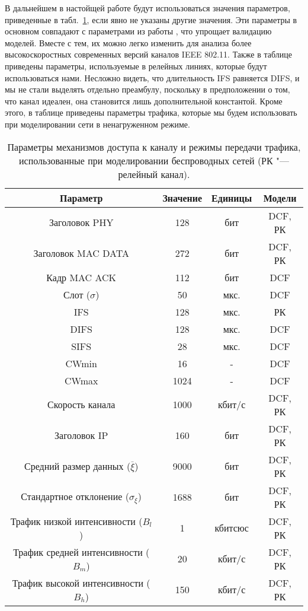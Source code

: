 В дальнейшем в настойщей работе будут использоваться значения параметров, приведенные в табл.~\ref{tab:ch1_channel_parameters}, если явно не указаны другие значения. Эти параметры в основном совпадают с параметрами из работы \cite{Bianchi2000}, что упрощает валидацию моделей. Вместе с тем, их можно легко изменить для анализа более высокоскоростных современных версий каналов IEEE 802.11. Также в таблице приведены параметры, используемые в релейных линиях, которые будут использоваться нами. Несложно видеть, что длительность IFS равняется DIFS, и мы не стали выделять отдельно преамбулу, поскольку в предположении о том, что канал идеален, она становится лишь дополнительной константой. Кроме этого, в таблице приведены параметры трафика, которые мы будем использовать при моделировании сети в ненагруженном режиме.

\begin{table}[h!]\begin{center}
\begin{tabular}{|c|c|c|c|}\hline
Параметр & Значение & Единицы & Модели\\ \hline\hline
Заголовок PHY & 128 & бит & DCF, РК\\ \hline
Заголовок MAC DATA & 272 & бит & DCF, РК \\ \hline
Кадр MAC ACK & 112 & бит & DCF \\ \hline
Слот ($\sigma$) & 50 & мкс. & DCF \\ \hline
IFS & 128 & мкс. & РК \\ \hline
DIFS & 128 & мкс. & DCF\\ \hline
SIFS & 28 & мкс. & DCF \\ \hline
CWmin & 16 & - & DCF \\ \hline
CWmax & 1024 & - & DCF \\ \hline
Скорость канала & 1000 & кбит/с & DCF, РК \\ \hline
Заголовок IP & 160 & бит & DCF, РК \\ \hline\hline
Средний размер данных ($\overline{\xi}$) & 9000 & бит & DCF, РК\\ \hline
Стандартное отклонение ($\sigma_\xi$) & 1688 & бит & DCF, РК\\ \hline
Трафик низкой интенсивности ($B_l$) & 1 & кбитсюс & DCF, РК \\ \hline
Трафик средней интенсивности ($B_m$) & 20 & кбит/с & DCF, РК\\ \hline
Трафик высокой интенсивности ($B_h$) & 150 & кбит/с & DCF, РК \\ \hline
\end{tabular}\caption{Параметры механизмов доступа к каналу и режимы передачи трафика, использованные при моделировании беспроводных сетей (РК "--- релейный канал).}\label{tab:ch1_channel_parameters}
\end{center}\end{table}





